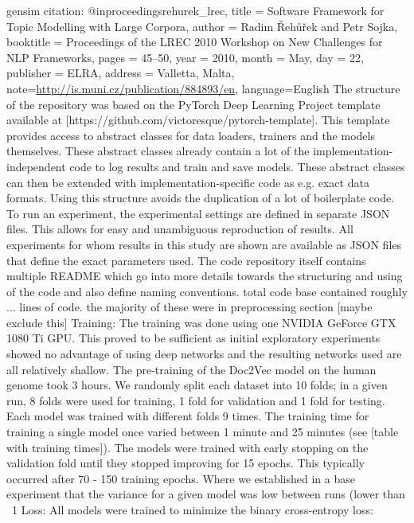gensim citation: 
@inproceedings{rehurek_lrec,
 title = {{Software Framework for Topic Modelling with Large Corpora}},
 author = {Radim {\v R}eh{\r u}{\v r}ek and Petr Sojka},
 booktitle = {{Proceedings of the LREC 2010 Workshop on New
 Challenges for NLP Frameworks}},
 pages = {45--50},
 year = 2010,
 month = May,
 day = 22,
 publisher = {ELRA},
 address = {Valletta, Malta},
 note={\url{http://is.muni.cz/publication/884893/en}},
 language={English}
}
The structure of the repository was based on the PyTorch Deep Learning Project template available at [https://github.com/victoresque/pytorch-template]. This template provides access to abstract classes for data loaders, trainers and the models themselves. These abstract classes already contain a lot of the implementation-independent code to log results and train and save models. These abstract classes can then be extended with implementation-specific code as e.g. exact data formats. Using this structure avoids the duplication of a lot of boilerplate code.
To run an experiment, the experimental settings are defined in separate JSON files. This allows for easy and unambiguous reproduction of results. All experiments for whom results in this study are shown are available as JSON files that define the exact parameters used.
The code repository itself contains multiple README which go into more details towards the structuring and using of the code and also define naming conventions.
total code base contained roughly ... lines of code. the majority of these were in preprocessing section [maybe exclude this]
Training:
The training was done using one NVIDIA GeForce GTX 1080 Ti GPU. This proved to be sufficient as initial exploratory experiments showed no advantage of using deep networks and the resulting networks used are all relatively shallow. The pre-training of the Doc2Vec model on the human genome took 3 hours. We randomly split each dataset into 10 folds; in a given run, 8 folds were used for training, 1 fold for validation and 1 fold for testing. Each model was trained with different folds 9 times.
The training time for training a single model once varied between 1 minute and 25 minutes (see [table with training times]). The models were trained with early stopping on the validation fold until they stopped improving for 15 epochs. This typically occurred after 70 - 150 training epochs.
Where we established in a base experiment that the variance for a given model was low between runs (lower than ~1%
Loss:
All models were trained to minimize the binary cross-entropy loss:
